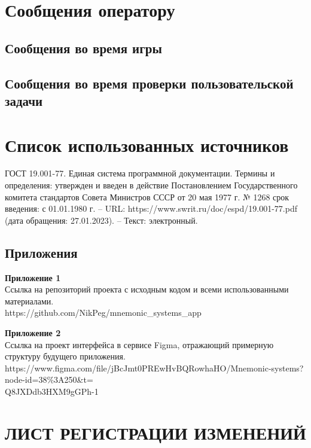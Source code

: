 \documentclass[draft]{article}
\newcommand\zz[1]{\par{\normalsize\strut #1} \hfill\ignorespaces}
\begin{document}
\section{Сообщения оператору}
\subsection{Сообщения во время игры}
\subsection{Сообщения во время проверки пользовательской задачи}
\newpage
{}
\section*{Список использованных источников}
\begin{thebibliography}{}
 ГОСТ 19.001-77. Единая система программной документации. Термины и определения: утвержден и введен в действие Постановлением Государственного комитета стандартов Совета Министров СССР от 20 мая 1977 г. № 1268 срок введения: с 01.01.1980 г. – URL: https://www.swrit.ru/doc/espd/19.001-77.pdf (дата обращения: 27.01.2023). – Текст: электронный.
\end{thebibliography}
\newpage
\begin{center}
\section*{Приложения}
\end{center}
\zz{}\textbf{Приложение 1\\}
Ссылка на репозиторий проекта с исходным кодом и всеми использованными материалами.\\
https://github.com/NikPeg/mnemonic\_systems\_app\\
\zz{}\textbf{Приложение 2\\}
Ссылка на проект интерфейса в сервисе Figma, отражающий примерную структуру будущего приложения.\\
https://www.figma.com/file/jBcJmt0PREwHvBQRowhaHO/Mnemonic-systems?node-id=38\%3A250\&t=\\
Q8JXDdb3HXM9gGPh-1\\
\newpage
\section*{ЛИСТ РЕГИСТРАЦИИ ИЗМЕНЕНИЙ}
\end{document}
